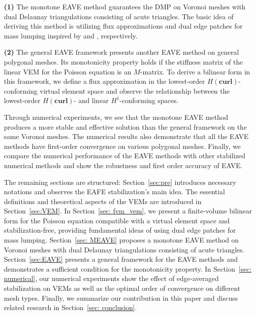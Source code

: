 \documentclass[a4paper]{article}
\theoremstyle{plain}
\theoremstyle{definition}
\numberwithin{equation}{section}
\begin{document}
\textbf{(1)} The monotone EAVE method guarantees the DMP on Voronoi meshes with dual Delaunay triangulations consisting of acute triangles.
The basic idea of deriving this method is utilizing flux approximations and dual edge patches for mass lumping inspired by \cite{XU99} and \cite{brezzi2006error}, respectively.

\textbf{(2)} The general EAVE framework presents another EAVE method on general polygonal meshes. Its monotonicity property holds if the stiffness matrix of the linear VEM for the Poisson equation is an $M$-matrix.
To derive a bilinear form in this framework, we define a flux approximation in the lowest-order $H(\textbf{curl})$-conforming virtual element space and observe the relationship between the lowest-order $H(\textbf{curl})$- and linear $H^1$-conforming spaces.


Through numerical experiments, we see that the monotone EAVE method produces a more stable and effective solution than the general framework on the same Voronoi meshes.
The numerical results also demonstrate that all the EAVE methods have first-order convergence on various polygonal meshes. Finally, we compare the numerical performance of the EAVE methods with other stabilized numerical methods and show the robustness and first order accuracy of EAVE.

The remaining sections are structured:
Section~\ref{sec:pre} introduces necessary notations and observes the EAFE stabilization's main idea.
The essential definitions and theoretical aspects of the VEMs are introduced in Section~\ref{sec:VEM}.
In Section~\ref{sec: fvm_vem}, we present a finite-volume bilinear form for the Poisson equation compatible with a virtual element space and stabilization-free, providing fundamental ideas of using dual edge patches for mass lumping.
Section~\ref{sec: MEAVE} proposes a monotone EAVE method on Voronoi meshes with dual Delaunay triangulations consisting of acute triangles.
Section~\ref{sec:EAVE} presents a general framework for the EAVE methods and demonstrates a sufficient condition for the monotonicity property.
In Section~\ref{sec: numerical}, our numerical experiments show the effect of edge-averaged stabilization on VEMs as well as the optimal order of convergence on different mesh types.
Finally, we summarize our contribution in this paper and discuss related research in Section~\ref{sec: conclusion}.




\end{document}

